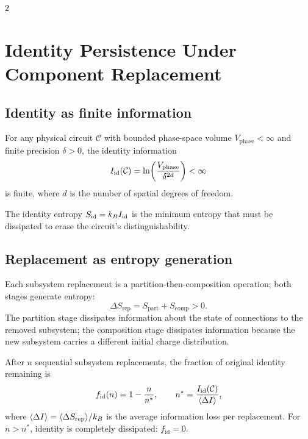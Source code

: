 \begin{multicols}{2}

\section{Identity Persistence Under Component Replacement}
\label{sec:ch07-identity}

\subsection{Identity as finite information}

\begin{theorem}
\label{thm:ch07-identity-finite}
For any physical circuit $\mathcal{C}$ with bounded phase-space volume
$V_{\mathrm{phase}} < \infty$ and finite precision $\delta > 0$, the
identity information
\begin{equation}
  I_{\mathrm{id}}(\mathcal{C}) = \ln\!\left(\frac{V_{\mathrm{phase}}}{\delta^{2d}}\right) < \infty
  \label{eq:ch07-Iid}
\end{equation}
is finite, where $d$ is the number of spatial degrees of freedom.
\end{theorem}

The identity entropy $S_{\mathrm{id}} = k_BI_{\mathrm{id}}$ is the minimum entropy that
must be dissipated to erase the circuit's distinguishability.

\subsection{Replacement as entropy generation}

Each subsystem replacement is a partition-then-composition operation; both
stages generate entropy:
\begin{equation}
  \Delta S_{\mathrm{rep}} = S_{\mathrm{part}} + S_{\mathrm{comp}} > 0.
  \label{eq:ch07-Srep}
\end{equation}
The partition stage dissipates information about the state of connections to
the removed subsystem; the composition stage dissipates information because
the new subsystem carries a different initial charge distribution.

\begin{theorem}
\label{thm:ch07-identity-decay}
After $n$ sequential subsystem replacements, the fraction of original
identity remaining is
\begin{equation}
  f_{\mathrm{id}}(n) = 1 - \frac{n}{n^*}, \qquad
  n^* = \frac{I_{\mathrm{id}}(\mathcal{C})}{\langle\Delta I\rangle},
  \label{eq:ch07-fid}
\end{equation}
where $\langle\Delta I\rangle = \langle\Delta S_{\mathrm{rep}}\rangle/k_B$ is
the average information loss per replacement.  For $n > n^*$, identity is
completely dissipated: $f_{\mathrm{id}} = 0$.
\end{theorem}


\end{multicols}
